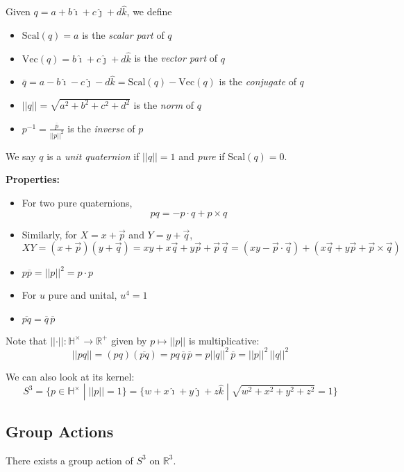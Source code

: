 \documentclass[12pt]{article}
\renewcommand{\hat}[1]{\widehat{#1}}
\newcommand{\R}{\mathbb{R}}
\renewcommand{\H}{\mathbb{H}}
\newcommand{\norm}[1]{\left\vert \left\vert #1 \right\vert \right\vert}
\renewcommand{\bar}[1]{\overline{#1}}
\newcommand{\ihat}{\hat{\imath}}
\newcommand{\jhat}{\hat{\jmath}}
\newcommand{\khat}{\hat{k}}
\begin{document}
Given $q = a + b\ihat + c\jhat + d\khat$, we define  
\begin{itemize}
    \item $\text{Scal}(q) = a$ is the \emph{scalar part} of $q$
    \item $\text{Vec}(q) = b\ihat + c\jhat + d\khat$ is the \emph{vector part} of $q$
    \item $\bar q = a - b\ihat - c\jhat - d\khat = \text{Scal}(q) - \text{Vec}(q)$ is the \emph{conjugate} of $q$
    \item $\norm{q} = \sqrt{a^2 + b^2 + c^2 + d^2}$ is the \emph{norm} of $q$
    \item $p^{-1} = \frac{\bar p}{\norm{p}^2}$ is the \emph{inverse} of $p$
\end{itemize}

We say $q$ is a \emph{unit quaternion} if $\norm{q} = 1$ and \emph{pure} if $\text{Scal}(q) = 0$.

\textbf{Properties:}
\begin{itemize}
    \item For two pure quaternions, 
    \[pq = -p \cdot q + p \times q\]
    
    \item Similarly, for $X = x + \vec p$ and $Y = y + \vec q$,
    \[XY = (x + \vec p)(y + \vec q) = xy + x\vec q + y\vec p + \vec p\, \vec q = (xy - \vec p \cdot \vec q) + (x\vec q + y\vec p + \vec p \times \vec q)\]

    \item $p \bar p = \norm{p}^2 = p \cdot p$
    
    \item For $u$ pure and unital, $u^4 = 1$ 
    
    \item $\bar{pq} = \bar q\, \bar p$
\end{itemize}

Note that $\norm{\cdot}: \H^{\times} \to \R^{+}$ given by $p \mapsto \norm{p}$ is multiplicative:
\[\norm{pq} = (pq)(\bar{pq}) = pq \, \bar q\, \bar p = p \norm{q}^2 \, \bar p = \norm{p}^2\, \norm{q}^2\]

We can also look at its kernel:
\[S^3 = \{p \in \H^{\times} \; | \; \norm{p} = 1\} = \{w + x\ihat + y\jhat + z \khat \; | \; \sqrt{w^2 +x^2 + y^2 + z^2} = 1\}\]

\subsection*{Group Actions}
There exists a group action of $S^3$ on $\R^3$. 
\end{document}
